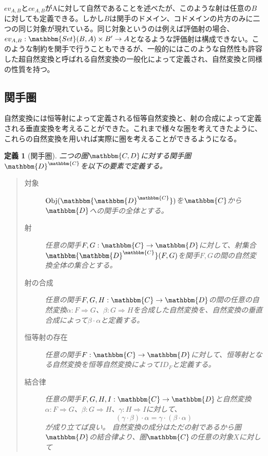 \documentclass[uplatex,dvipdfmx]{jsarticle}
\newcommand{\cat}[1]{\mathbbm{#1}}
\newcommand{\arrow}{\rightarrow}
\newcommand{\functor}[3]{#1:\cat{#2}\arrow \cat{#3}}
\newcommand{\nat}[3]{#1:#2\Rightarrow #3}
\newcommand{\obj}[1]{\mathrm{Obj}(\cat{#1})}
\newcommand{\mor}[3]{#1:#2\arrow #3}
\newcommand{\arset}[3]{\cat{#1}(#2,#3)}
\newcommand{\funccat}[2]{\cat{#2}^\cat{#1}}
\newtheorem{define}{定義}[section]
\numberwithin{proof}{subsection}
\numberwithin{prop}{subsection}
\numberwithin{define}{subsection}
\begin{document}
  $ev_{A,B}$と$ce_{A,B}$がAに対して自然であることを述べたが、このような射は任意の$B$に対しても定義できる。しかし$B$は関手のドメイン、コドメインの片方のみに二つの同じ対象が現れている。同じ対象というのは例えば評価射の場合、$\mor{ev_{A,B}}{\arset{Set}{B}{A}\times B'}{A}$となるような評価射は構成できない。このような制約を関手で行うこともできるが、一般的にはこのような自然性も許容した超自然変換と呼ばれる自然変換の一般化によって定義され、自然変換と同様の性質を持つ。
	\subsection{関手圏}
	自然変換には恒等射によって定義される恒等自然変換と、射の合成によって定義される垂直変換を考えることができた。これまで様々な圏を考えてきたように、これらの自然変換を用いれば実際に圏を考えることができるようになる。
	\begin{define}[関手圏]
		二つの圏$\cat{C,D}$に対する関手圏$\funccat{C}{D}$を以下の要素で定義する。
		\begin{quote}
			\begin{description}
				\item[対象] $\obj{\funccat{C}{D}}$を$\cat{C}$から$\cat{D}$への関手の全体とする。
				\item[射]任意の関手$\functor{F,G}{C}{D}$に対して、射集合$\arset{\funccat{C}{D}}{F}{G}$を関手$F,G$の間の自然変換全体の集合とする。
				\item[射の合成] 任意の関手$\functor{F,G,H}{C}{D}$の間の任意の自然変換$\nat{\alpha}{F}{G}$、$\nat{\beta}{G}{H}$を合成した自然変換を、自然変換の垂直合成によって$\beta\cdot\alpha$と定義する。
				\item[恒等射の存在]任意の関手$\functor{F}{C}{D}$に対して、恒等射となる自然変換を恒等自然変換によって$ID_F$と定義する。
				\item[結合律]任意の関手$\functor{F,G,H,I}{C}{D}$と自然変換$\nat{\alpha}{F}{G}$、$\nat{\beta}{G}{H}$、$\nat{\gamma}{H}{I}$に対して、\[(\gamma\cdot\beta)\cdot\alpha=\gamma\cdot(\beta\cdot\alpha)\]が成り立てば良い。
				自然変換の成分はただの射であるから圏$\cat{D}$の結合律より、圏$\cat{C}$の任意の対象$X$に対して


\end{description}
\end{quote}
\end{define}
\end{document}
